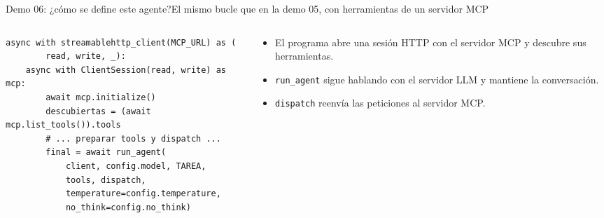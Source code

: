 \begin{frame}[fragile]{Demo 06: ¿cómo se define este agente?}{El mismo bucle que en la demo 05, con herramientas de un servidor MCP}
	\begin{columns}[T]
		\begin{column}{0.58\textwidth}
			\begin{lstlisting}
async with streamablehttp_client(MCP_URL) as (
        read, write, _):
    async with ClientSession(read, write) as mcp:
        await mcp.initialize()
        descubiertas = (await mcp.list_tools()).tools
        # ... preparar tools y dispatch ...
        final = await run_agent(
            client, config.model, TAREA,
            tools, dispatch,
            temperature=config.temperature,
            no_think=config.no_think)
\end{lstlisting}
		\end{column}
		\begin{column}{0.4\textwidth}
			\footnotesize
			\begin{itemize}
				\setlength{\itemsep}{1pt}
				\item El programa abre una sesión HTTP con el servidor MCP y descubre sus herramientas.
				\item \texttt{run\_agent} sigue hablando con el servidor LLM y mantiene la conversación.
				\item \texttt{dispatch} reenvía las peticiones al servidor MCP.
			\end{itemize}
		\end{column}
	\end{columns}
\end{frame}

